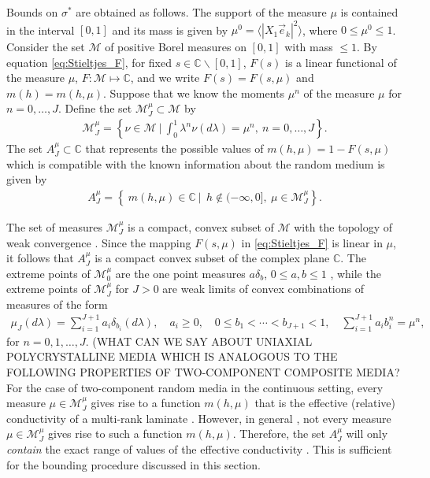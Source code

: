 \documentclass[11pt]{amsart}
\begin{document}
Bounds on $\sigma^*$ are obtained as follows. The support of the measure
$\mu$ is contained in the interval $[0,1]$ and its mass is given by 
$\mu^0=\langle|X_1\vec{e}_k|^2\rangle$, where $0\leq\mu^0\leq1$. Consider the set $\mathscr{M}$ of
positive Borel measures on $[0,1]$ with mass $\leq1$. By equation
\eqref{eq:Stieltjes_F}, for fixed $s\in\mathbb{C}\backslash[0,1]$, $F(s)$ is a
linear functional of the measure $\mu$, $F:\mathscr{M}\mapsto\mathbb{C}$, and
we write $F(s)=F(s,\mu)$ and $m(h)=m(h,\mu)$. Suppose that we know the
moments $\mu^n$ of the measure $\mu$ for $n=0,\ldots,J$. Define the set
$\mathscr{M}_J^\mu\subset\mathscr{M}$
by 
% 
\begin{align}\label{eq:Measure_Set}
  \mathscr{M}_J^\mu
     =\left\{\nu\in\mathscr{M} \ \Big| \   \int_0^1\lambda^n\nu(d\lambda)=\mu^n, \  n=0,\ldots,J\right\}  . 
\end{align}
%
The set $A_J^\mu\subset\mathbb{C}$ that represents the possible
values of $m(h,\mu)=1-F(s,\mu)$ which is compatible with the
known information about the random medium is given by
%
\begin{align}\label{eq:Bounding_Set}
  A_J^\mu
     =\left\{\ m(h,\mu)\in\mathbb{C} \ | \
       \ h\not\in(-\infty,0], \ \mu\in \mathscr{M}_J^\mu\right\}. 
\end{align}
%



The set of measures $\mathscr{M}_J^\mu$ is a compact, convex
subset of $\mathscr{M}$ with the topology of weak convergence
\cite{Golden:CMP-473}. Since the mapping $F(s,\mu)$ in
\eqref{eq:Stieltjes_F} is linear in $\mu$, it follows that
$A_J^\mu$ is a compact convex subset of the complex plane
$\mathbb{C}$. The extreme points of $\mathscr{M}_0^\mu$ are the one 
point measures $a\delta_b$, $0\leq a,b\leq1$ \cite{Dunford_Schwartz:LinOp_PtI},
while the extreme points of $\mathscr{M}_J^\mu$ for $J>0$ are weak limits
of convex combinations of measures of the form
\cite{Karlin_Studden:Book:1966,Golden:CMP-473}  
%
\begin{align}\label{eq:Discrete_Measure}
  \mu_J(d\lambda)=\sum_{i=1}^{J+1}a_i\delta_{b_i}(d\lambda), \quad
  a_i\geq0, \quad 0\leq b_1<\cdots<b_{J+1}<1, \quad
  \sum_{i=1}^{J+1}a_ib_i^n=\mu^n,
\end{align}
%
for $n=0,1,\ldots,J$.
(WHAT CAN WE SAY ABOUT UNIAXIAL POLYCRYSTALLINE MEDIA WHICH IS
ANALOGOUS TO THE FOLLOWING PROPERTIES OF TWO-COMPONENT COMPOSITE MEDIA?
For the case of two-component random media in the
continuous setting, every measure $\mu\in\mathscr{M}_J^\mu$ gives rise
to a function $m(h,\mu)$ that is the effective (relative) conductivity
of a multi-rank laminate \cite{MILTON:2002:TC}.
However, in general \cite{Golden:CMP-473},  not every measure
$\mu\in\mathscr{M}_J^\mu$ gives rise to such a function $m(h,\mu)$. Therefore,
the set $A_J^\mu$ will only \emph{contain} the exact range of values of the
effective conductivity \cite{Golden:CMP-473}. This is sufficient for
the bounding procedure discussed in this section. 
\end{document}
